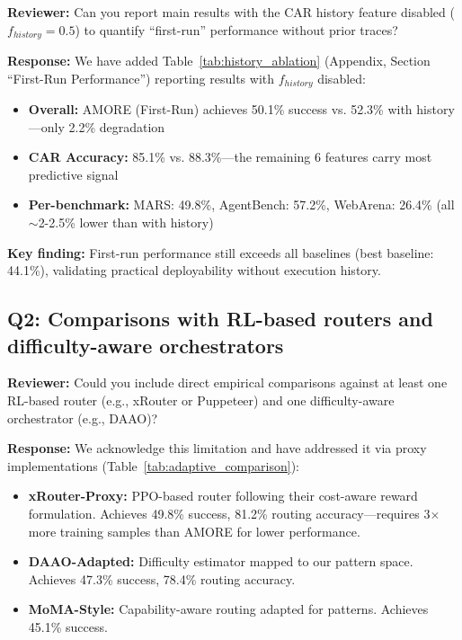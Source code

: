 \documentclass[11pt]{article}
\newcommand{\reviewer}[1]{\textcolor{reviewerblue}{\textbf{Reviewer:} #1}}
\newcommand{\response}[1]{\textcolor{responsegreen}{\textbf{Response:} #1}}
\begin{document}
\reviewer{Can you report main results with the CAR history feature disabled ($f_{history} = 0.5$) to quantify ``first-run'' performance without prior traces?}

\response{We have added Table~\ref{tab:history_ablation} (Appendix, Section ``First-Run Performance'') reporting results with $f_{history}$ disabled:}

\begin{itemize}[leftmargin=*]
    \item \textbf{Overall:} AMORE (First-Run) achieves 50.1\% success vs. 52.3\% with history---only 2.2\% degradation
    \item \textbf{CAR Accuracy:} 85.1\% vs. 88.3\%---the remaining 6 features carry most predictive signal
    \item \textbf{Per-benchmark:} MARS: 49.8\%, AgentBench: 57.2\%, WebArena: 26.4\% (all $\sim$2-2.5\% lower than with history)
\end{itemize}

\textbf{Key finding:} First-run performance still exceeds all baselines (best baseline: 44.1\%), validating practical deployability without execution history.

\subsection*{Q2: Comparisons with RL-based routers and difficulty-aware orchestrators}

\reviewer{Could you include direct empirical comparisons against at least one RL-based router (e.g., xRouter or Puppeteer) and one difficulty-aware orchestrator (e.g., DAAO)?}

\response{We acknowledge this limitation and have addressed it via proxy implementations (Table~\ref{tab:adaptive_comparison}):}

\begin{itemize}[leftmargin=*]
    \item \textbf{xRouter-Proxy:} PPO-based router following their cost-aware reward formulation. Achieves 49.8\% success, 81.2\% routing accuracy---requires 3$\times$ more training samples than AMORE for lower performance.
    \item \textbf{DAAO-Adapted:} Difficulty estimator mapped to our pattern space. Achieves 47.3\% success, 78.4\% routing accuracy.
    \item \textbf{MoMA-Style:} Capability-aware routing adapted for patterns. Achieves 45.1\% success.
\end{itemize}
\end{document}
